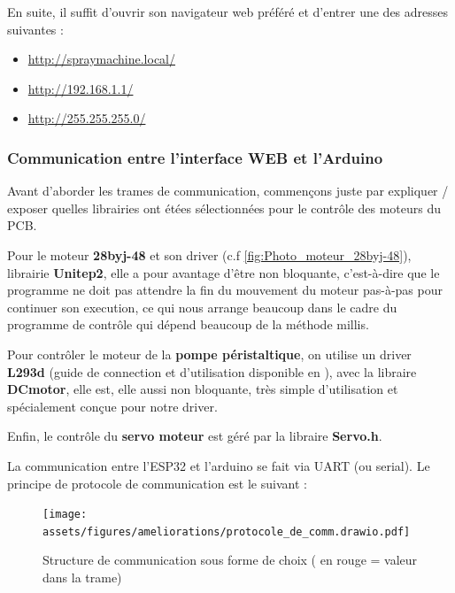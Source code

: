 En suite, il suffit d'ouvrir son navigateur web préféré et d'entrer une des adresses suivantes :
\begin{itemize}
    \item \url{http://spraymachine.local/}
    \item \url{http://192.168.1.1/}
    \item \url{http://255.255.255.0/}
\end{itemize}

\subsubsection{Communication entre l'interface WEB et l'Arduino}
Avant d'aborder les trames de communication, commençons juste par expliquer / exposer quelles librairies ont étées sélectionnées
pour le contrôle des moteurs du PCB.

Pour le moteur \textbf{28byj-48} et son driver (c.f \autoref{fig:Photo_moteur_28byj-48}), librairie \textbf{Unitep2}\cite{Unistep2}\footnotemark {},
elle a pour avantage d'être non bloquante, c'est-à-dire que le programme ne doit pas attendre la fin du mouvement du moteur pas-à-pas pour continuer son execution, ce qui nous arrange beaucoup dans le cadre du programme
de contrôle qui dépend beaucoup de la méthode millis.

Pour contrôler le moteur de la \textbf{pompe péristaltique}, on utilise un driver \textbf{L293d} (guide de connection et d'utilisation disponible en \autocite{L293D_tuto}\footnotemark{}),
avec la libraire \textbf{DCmotor}\cite{DCmotor}\footnotemark{}, elle est, elle aussi non bloquante, très simple d'utilisation et spécialement conçue pour notre driver.

Enfin, le contrôle du \textbf{servo moteur} est géré par la libraire \textbf{Servo.h}\cite{Servo}\footnotemark{}.

\newpage
La communication entre l'ESP32 et l'arduino se fait via UART (ou serial). Le principe de protocole de communication est le suivant :
\begin{figure}[H]
    \centering
    \texttt{[image: assets/figures/ameliorations/protocole\_de\_comm.drawio.pdf]}
    \caption[Structure de communication]{Structure de communication sous forme de choix ( en \color{red} rouge \color{black} = valeur dans la trame)}
\end{figure}